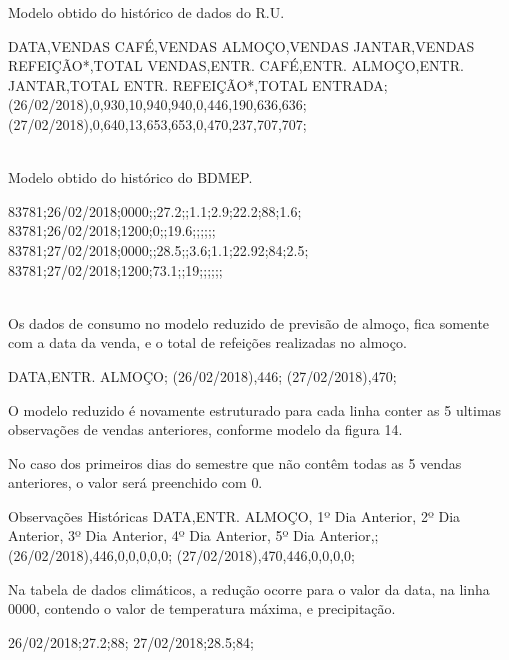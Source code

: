 \documentclass[	12pt, Times, openright, twoside, a4paper, english, brazil]{abntex2}
\begin{document}
	Modelo obtido do histórico de dados do R.U.\\
	\begin{algorithm}
		DATA,VENDAS CAFÉ,VENDAS ALMOÇO,VENDAS JANTAR,VENDAS REFEIÇÃO*,TOTAL VENDAS,ENTR. CAFÉ,ENTR. ALMOÇO,ENTR. JANTAR,TOTAL ENTR. REFEIÇÃO*,TOTAL ENTRADA;
		(26/02/2018),0,930,10,940,940,0,446,190,636,636;
		(27/02/2018),0,640,13,653,653,0,470,237,707,707;   
	\end{algorithm}\\
	
	Modelo obtido do histórico do BDMEP.\\
	\begin{algorithm}
		83781;26/02/2018;0000;;27.2;;1.1;2.9;22.2;88;1.6;
		83781;26/02/2018;1200;0;;19.6;;;;;;
		83781;27/02/2018;0000;;28.5;;3.6;1.1;22.92;84;2.5;
		83781;27/02/2018;1200;73.1;;19;;;;;;   
	\end{algorithm}\\
	
	Os dados de consumo no modelo reduzido de previsão de almoço, fica somente com a data da venda, e o total de refeições realizadas no almoço.\\
	
	\begin{algorithm}
		DATA,ENTR. ALMOÇO;
		(26/02/2018),446;
		(27/02/2018),470;   
	\end{algorithm}
	
	O modelo reduzido é novamente estruturado para cada linha conter as 5 ultimas observações de vendas anteriores, conforme modelo da figura 14.
	
	No caso dos primeiros dias do semestre que não contêm todas as 5 vendas anteriores, o valor será preenchido com 0.
	
	\begin{algorithm}{Observações Históricas}
		\linebreak DATA,ENTR. ALMOÇO, 1º Dia Anterior, 2º Dia Anterior, 3º Dia Anterior, 4º Dia Anterior, 5º Dia Anterior,;
		\linebreak(26/02/2018),446,0,0,0,0,0;
		\linebreak(27/02/2018),470,446,0,0,0,0;   
	\end{algorithm}
	
	Na tabela de dados climáticos, a redução ocorre para o valor da data, na linha 0000, contendo o valor de temperatura máxima, e precipitação.\\
	
	\begin{algorithm}
		26/02/2018;27.2;88;
		27/02/2018;28.5;84;
	\end{algorithm}
	
\end{document}
